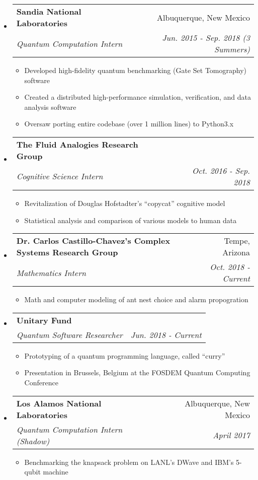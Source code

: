 \documentclass[letterpaper,11pt]{article}
\makeatletter
\newcommand{\resitem}[1]{\item #1 \vspace{-2pt}}
\newcommand{\resheading}[1]{
{\large \parashade[.9]{sharpcorners}{\textbf{\underline{#1} \vphantom{p\^{E}}}}}
}
\newcommand{\colfill}{@{\extracolsep{\fill}}}
\newcommand{\ressubheading}[4]{
\begin{tabular*}{6.5in}{l\colfill r}
		\textbf{#1} & #2 \\
		\textit{#3} & \textit{#4} \\
\end{tabular*}\vspace{-6pt}}
\makeatother
\begin{document}
\resheading{Experience}
\begin{itemize}
 \item
     \ressubheading{Sandia National Laboratories}{Albuquerque, New Mexico}{Quantum Computation Intern}{Jun. 2015 - Sep. 2018 (3 Summers)}
 	\begin{itemize}
        \resitem{Developed high-fidelity quantum benchmarking (Gate Set Tomography) software}
 		\resitem{Created a distributed high-performance simulation, verification, and data analysis software}
        \resitem{Oversaw porting entire codebase (over 1 million lines) to Python3.x}
 	\end{itemize}
 \item
     \ressubheading{The Fluid Analogies Research Group}{}{Cognitive Science Intern}{Oct. 2016 - Sep. 2018}
 	\begin{itemize}
 		\resitem{Revitalization of Douglas Hofstadter's ``copycat'' cognitive model}
 		\resitem{Statistical analysis and comparison of various models to human data}
 	\end{itemize}
 \item
     \ressubheading{Dr. Carlos Castillo-Chavez's Complex Systems Research Group}{Tempe, Arizona}{Mathematics Intern}{Oct. 2018 - Current}
 	\begin{itemize}
 		\resitem{Math and computer modeling of ant nest choice and alarm propogration}
 	\end{itemize}
 \item
     \ressubheading{Unitary Fund}{}{Quantum Software Researcher}{Jun. 2018 - Current}
 	\begin{itemize}
            \resitem{Prototyping of a quantum programming language, called ``curry''}
            \resitem{Presentation in Brussels, Belgium at the FOSDEM Quantum Computing Conference}
 	\end{itemize}
 \item
     \ressubheading{Los Alamos National Laboratories}{Albuquerque, New Mexico}{Quantum Computation Intern (Shadow)}{April 2017}
 	\begin{itemize}
 		\resitem{Benchmarking the knapsack problem on LANL's DWave and IBM's 5-qubit machine}
 	\end{itemize}
\end{itemize}
\end{document}
